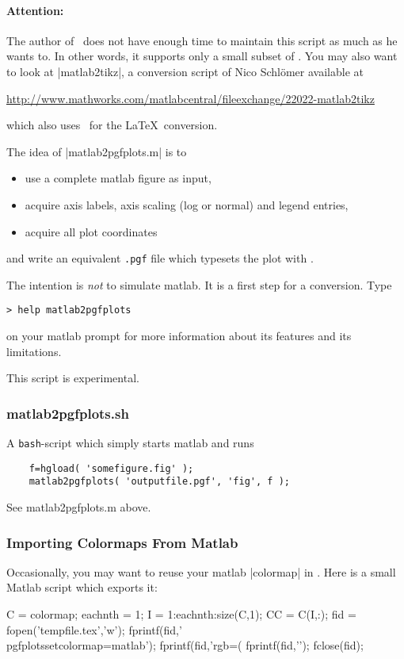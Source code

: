 {\begin{pgfgraphicnamed}
\paragraph{Attention:} The author of \PGFPlots\ does not have enough time to maintain this script as much as he wants to. In other words, it supports only a small subset of \PGFPlots. You may also want to look at |matlab2tikz|, a conversion script of Nico Schl\"omer available at

\url{http://www.mathworks.com/matlabcentral/fileexchange/22022-matlab2tikz}

\noindent which also uses \PGFPlots\ for the \LaTeX\ conversion.

\medskip
The idea of |matlab2pgfplots.m| is to
\begin{itemize}
	\item use a complete matlab figure as input,
	\item acquire axis labels, axis scaling (log or normal) and legend entries,
	\item acquire all plot coordinates
\end{itemize}
and write an equivalent \texttt{.pgf} file which typesets the plot with \PGFPlots.

The intention is \emph{not} to simulate matlab. It is a first step for a conversion. Type
\begin{lstlisting}
> help matlab2pgfplots
\end{lstlisting}
on your matlab prompt for more information about its features and its limitations.

This script is experimental.

\subsubsection{matlab2pgfplots.sh}
A \texttt{bash}-script which simply starts matlab and runs 
\begin{lstlisting}
	f=hgload( 'somefigure.fig' );
	matlab2pgfplots( 'outputfile.pgf', 'fig', f );
\end{lstlisting}
See matlab2pgfplots.m above.

\subsubsection{Importing Colormaps From Matlab}
Occasionally, you may want to reuse your matlab |colormap| in \PGFPlots. Here is a small Matlab script which exports it:
\begin{codeexample}
C = colormap;  %
eachnth = 1;
I = 1:eachnth:size(C,1); %
CC = C(I,:);
fid = fopen('tempfile.tex','w'); %
fprintf(fid,'\\pgfplotsset{colormap={matlab}{\n');
fprintf(fid,'rgb=(%
fprintf(fid,'}}\n');
fclose(fid); %
\end{codeexample}


\end{pgfgraphicnamed}}
